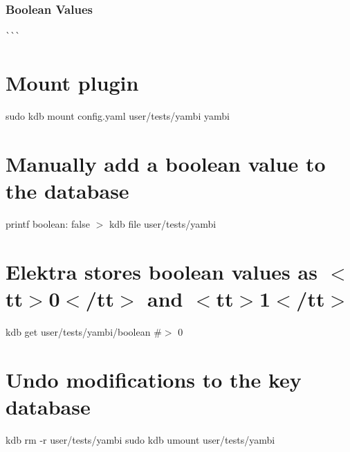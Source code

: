 \begin{DoxyCode}{0}
\DoxyCodeLine{}
\DoxyCodeLine{}
\DoxyCodeLine{}
\DoxyCodeLine{}
\end{DoxyCode}
\hypertarget{autotoc_md753_autotoc_md759}{}\subsubsection{Boolean Values}\label{autotoc_md753_autotoc_md759}
\`{}\`{}\`{} \hypertarget{autotoc_md753_autotoc_md760}{}\section{Mount plugin}\label{autotoc_md753_autotoc_md760}
sudo kdb mount config.\+yaml user/tests/yambi yambi\hypertarget{autotoc_md753_autotoc_md761}{}\section{Manually add a boolean value to the database}\label{autotoc_md753_autotoc_md761}
printf \textquotesingle{}boolean\+: false\textquotesingle{} $>$ {\ttfamily kdb file user/tests/yambi}\hypertarget{autotoc_md753_autotoc_md762}{}\section{Elektra stores boolean values as $<$tt$>$0$<$/tt$>$ and $<$tt$>$1$<$/tt$>$}\label{autotoc_md753_autotoc_md762}
kdb get user/tests/yambi/boolean \#$>$ 0\hypertarget{autotoc_md753_autotoc_md763}{}\section{Undo modifications to the key database}\label{autotoc_md753_autotoc_md763}
kdb rm -\/r user/tests/yambi sudo kdb umount user/tests/yambi 
\begin{DoxyCode}{0}
\end{DoxyCode}
